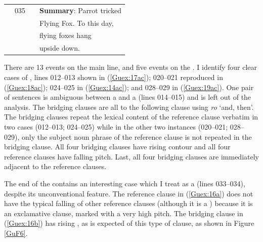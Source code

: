 \documentclass[output=paper]{LSP/langsci}
\begin{document}
\begin{table}[]
\begin{tabular}{llll}
                                               & 035               &                 & \textbf{Summary}:  Parrot tricked                     \\
                                                 &                   &                 & Flying Fox. To this day,                  \\
                                              &                   &                 &  flying foxes hang       \\
                                              &                   &                 &        upside   down.                  \\ 
\end{tabular}
\end{table}



There are 13 events on the main line, and five events on the . I identify four clear cases of , lines 012--013  shown in (\ref{Guex:17ac}); 020--021 reproduced in (\ref{Guex:18ac}); 024--025 in (\ref{Guex:14ac}); and 028--029 in (\ref{Guex:19ac}). One pair of sentences is ambiguous between a  and a  (lines 014--015) and is left out of the analysis.  The bridging clauses are all  to the following clause using \textit{ro} `and, then'.  The bridging clauses repeat the lexical content of the reference clause verbatim in two cases (012--013; 024--025) while in the other two instances (020--021; 028--029), only the subject noun phrase of the reference clause is not repeated in the bridging clause. All four bridging clauses have rising  contour and all four reference clauses have falling pitch. Last, all four bridging clauses are immediately adjacent to the reference clauses. 

The end of the  contains an interesting case which I treat as a  (lines 033--034), despite its unconventional feature. The reference clause in (\ref{Guex:16a}) does not have the typical falling  of other reference clauses (although it is a ) because it is  an exclamative clause, marked with a very high pitch. The bridging clause in (\ref{Guex:16b}) has rising , as is expected of this type of clause, as shown in Figure \ref{GuF6}.
\end{document}
